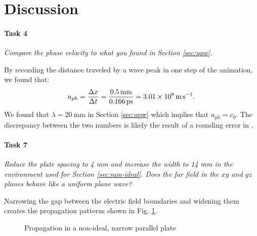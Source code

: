 \section{Discussion}\label{sec:discussion}
\paragraph{Task 4} \textit{Compare the phase velocity to what you found in Section \ref{sec:upw}.}

By recording the distance traveled by a wave peak in one step of the animation, we found that:
\begin{equation*}
	u_{ph} = {\Delta x \over \Delta t} = {\SI{0.5}{\milli\meter} \over \SI{0.166}{\pico\second}} = \SI{3.01E8}{\meter\per\second}.
\end{equation*}
We found that $\lambda = \SI{20}{\milli\meter}$ in Section \ref{sec:upw} which implies that $u_{ph} = c_0$. The discrepancy between the two numbers is likely the result of a rounding error in \mefisto.

\paragraph{Task 7} \textit{Reduce the plate spacing to 4 mm and increase the width to 14 mm in the environment used for Section \ref{sec:non-ideal}.
Does the far field in the $xy$ and $yz$ planes behave like a uniform plane wave?}

Narrowing the gap between the electric field boundaries and widening them creates the propagation patterns shown in Fig. \ref{fig:narrow}.

\begin{figure}[htpb]
	\centering
	\caption{Propagation in a non-ideal, narrow parallel plate}
	\label{fig:narrow}
\end{figure}

